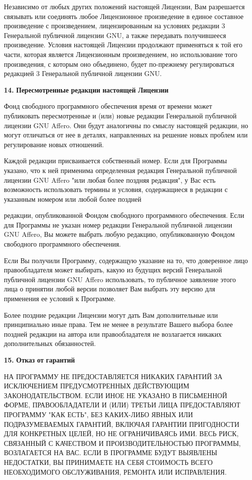 Независимо от любых других положений настоящей Лицензии, Вам разрешается связывать или соединять любое Лицензионное произведение в единое составное произведение с произведением, лицензированным на условиях редакции 3 Генеральной публичной лицензии GNU, а также передавать получившееся произведение. Условия настоящей Лицензии продолжают применяться к той его части, которая является Лицензионным произведением, но использование того произведения, с которым оно объединено, будет по-\/прежнему регулироваться редакцией 3 Генеральной публичной лицензии GNU.

{\bfseries{14.}} {\bfseries{Пересмотренные}} {\bfseries{редакции}} {\bfseries{настоящей}} {\bfseries{Лицензии}}

Фонд свободного программного обеспечения время от времени может публиковать пересмотренные и (или) новые редакции Генеральной публичной лицензии GNU Affero. Они будут аналогичны по смыслу настоящей редакции, но могут отличаться от нее в деталях, направленных на решение новых проблем или регулирование новых отношений.

Каждой редакции присваивается собственный номер. Если для Программы указано, что к ней применима определенная редакция Генеральной публичной лицензии GNU Affero "{}или любая более поздняя редакция"{}, у Вас есть возможность использовать термины и условия, содержащиеся в редакции с указанным номером или любой более поздней

редакции, опубликованной Фондом свободного программного обеспечения. Если для Программы не указан номер редакции Генеральной публичной лицензии GNU Affero, Вы можете выбрать любую редакцию, опубликованную Фондом свободного программного обеспечения.

Если Вы получили Программу, содержащую указание на то, что доверенное лицо правообладателя может выбирать, какую из будущих версий Генеральной публичной лицензии GNU Affero использовать, то публичное заявление этого лица о принятии любой версии позволяет Вам выбрать эту версию для применения ее условий к Программе.

Более поздние редакции Лицензии могут дать Вам дополнительные или принципиально иные права. Тем не менее в результате Вашего выбора более поздней редакции на автора или правообладателя не возлагается никаких дополнительных обязанностей.

{\bfseries{15.}} {\bfseries{Отказ}} {\bfseries{от}} {\bfseries{гарантий}}

НА ПРОГРАММУ НЕ ПРЕДОСТАВЛЯЕТСЯ НИКАКИХ ГАРАНТИЙ ЗА ИСКЛЮЧЕНИЕМ ПРЕДУСМОТРЕННЫХ ДЕЙСТВУЮЩИМ ЗАКОНОДАТЕЛЬСТВОМ. ЕСЛИ ИНОЕ НЕ УКАЗАНО В ПИСЬМЕННОЙ ФОРМЕ, ПРАВООБЛАДАТЕЛИ И (ИЛИ) ТРЕТЬИ ЛИЦА ПРЕДОСТАВЛЯЮТ ПРОГРАММУ "{}КАК ЕСТЬ"{}, БЕЗ КАКИХ-\/ЛИБО ЯВНЫХ ИЛИ ПОДРАЗУМЕВАЕМЫХ ГАРАНТИЙ, ВКЛЮЧАЯ ГАРАНТИИ ПРИГОДНОСТИ ДЛЯ КОНКРЕТНЫХ ЦЕЛЕЙ, НО НЕ ОГРАНИЧИВАЯСЬ ИМИ. ВЕСЬ РИСК, СВЯЗАННЫЙ С КАЧЕСТВОМ И ПРОИЗВОДИТЕЛЬНОСТЬЮ ПРОГРАММЫ, ВОЗЛАГАЕТСЯ НА ВАС. ЕСЛИ В ПРОГРАММЕ БУДУТ ВЫЯВЛЕНЫ НЕДОСТАТКИ, ВЫ ПРИНИМАЕТЕ НА СЕБЯ СТОИМОСТЬ ВСЕГО НЕОБХОДИМОГО ОБСЛУЖИВАНИЯ, РЕМОНТА ИЛИ ИСПРАВЛЕНИЯ.

